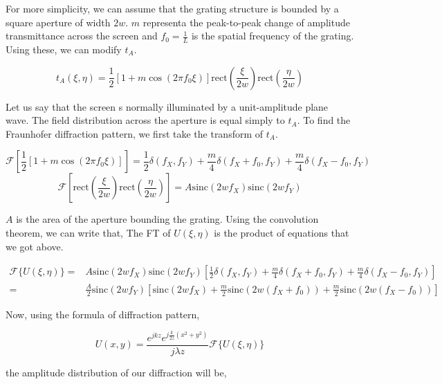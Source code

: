 \documentclass[a4paper,11pt]{article}
\begin{document}
For more simplicity, we can assume that the grating structure is bounded by a square aperture of width \(2w\). \(m\) representa the peak-to-peak change of amplitude transmittance across the screen and \(f_0=\frac{1}{L}\) is the spatial frequency of the grating. Using these, we can modify \(t_A\).

\begin{equation}
\label{eq:orgf9fd229}
t_{A}(\xi,\eta) = \frac{1}{2}\left[1+m\cos\left(2\pi f_0\xi\right)\right]\text{rect}\left(\frac{\xi}{2w}\right)\text{rect}\left(\frac{\eta}{2w}\right)
\end{equation}

Let us say that the screen s normally illuminated by a unit-amplitude plane wave. The field distribution across the aperture is equal simply to \(t_A\). To find the Fraunhofer diffraction pattern, we first take the transform of \(t_A\).

$$\mathcal{F}\left[\frac{1}{2}\left[1+m\cos\left(2\pi f_0\xi\right)\right]\right] = \frac{1}{2}\delta(f_X,f_Y) +\frac{m}{4}\delta(f_X+f_0,f_Y) + \frac{m}{4}\delta(f_X-f_0,f_Y) $$
$$\mathcal{F}\left[\text{rect}\left(\frac{\xi}{2w}\right)\text{rect}\left(\frac{\eta}{2w}\right)\right] = A \text{sinc}(2wf_X)\text{sinc}(2wf_Y)$$

\(A\) is the area of the aperture bounding the grating. Using the convolution theorem, we can write that, The FT of \(U(\xi,\eta)\) is the product of equations that we got above.

\begin{equation}
\label{eq:org41a07a5}
\begin{split}
\mathcal{F}\{U(\xi,\eta)\} = & A \text{sinc}(2wf_X)\text{sinc}(2wf_Y) \left[ \frac{1}{2}\delta(f_X,f_Y) +\frac{m}{4}\delta(f_X+f_0,f_Y) + \frac{m}{4}\delta(f_X-f_0,f_Y)\right] \\
= & \frac{A}{2}\text{sinc}(2wf_Y)\left[\text{sinc}(2wf_X) +\frac{m}{2}\text{sinc}(2w(f_X+f_0)) + \frac{m}{2}\text{sinc}(2w(f_X-f_0))\right]
\end{split}
\end{equation}

Now, using the formula of diffraction pattern,

\begin{equation}
\label{eq:org6f83e14}
U(x,y) = \frac{e^{jkz}e^{j\frac{k}{2z}(x^2+y^2)}}{j\lambda z} \mathcal{F}\{U(\xi,\eta)\}
\end{equation}

the amplitude distribution of our diffraction will be,
\end{document}
